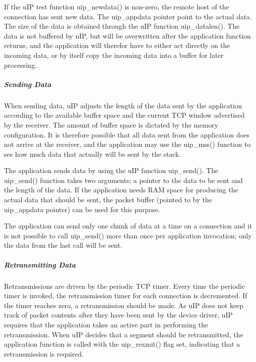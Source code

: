 If the u\+IP test function uip\+\_\+newdata() is non-\/zero, the remote host of the connection has sent new data. The uip\+\_\+appdata pointer point to the actual data. The size of the data is obtained through the u\+IP function uip\+\_\+datalen(). The data is not buffered by u\+IP, but will be overwritten after the application function returns, and the application will therefor have to either act directly on the incoming data, or by itself copy the incoming data into a buffer for later processing.\hypertarget{a00074_senddata}{}\subparagraph{Sending Data}\label{a00074_senddata}
When sending data, u\+IP adjusts the length of the data sent by the application according to the available buffer space and the current T\+CP window advertised by the receiver. The amount of buffer space is dictated by the memory configuration. It is therefore possible that all data sent from the application does not arrive at the receiver, and the application may use the uip\+\_\+mss() function to see how much data that actually will be sent by the stack.

The application sends data by using the u\+IP function uip\+\_\+send(). The uip\+\_\+send() function takes two arguments; a pointer to the data to be sent and the length of the data. If the application needs R\+AM space for producing the actual data that should be sent, the packet buffer (pointed to by the uip\+\_\+appdata pointer) can be used for this purpose.

The application can send only one chunk of data at a time on a connection and it is not possible to call uip\+\_\+send() more than once per application invocation; only the data from the last call will be sent.\hypertarget{a00074_rexmitdata}{}\subparagraph{Retransmitting Data}\label{a00074_rexmitdata}
Retransmissions are driven by the periodic T\+CP timer. Every time the periodic timer is invoked, the retransmission timer for each connection is decremented. If the timer reaches zero, a retransmission should be made. As u\+IP does not keep track of packet contents after they have been sent by the device driver, u\+IP requires that the application takes an active part in performing the retransmission. When u\+IP decides that a segment should be retransmitted, the application function is called with the uip\+\_\+rexmit() flag set, indicating that a retransmission is required.

